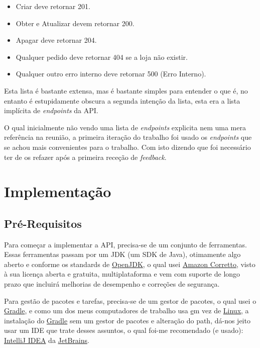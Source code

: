 \begin{itemize}
  \item Criar deve retornar 201.
  \item Obter e Atualizar devem retornar 200.
  \item Apagar deve retornar 204.
  \item Qualquer pedido deve retornar 404 se a loja não existir.
  \item Qualquer outro erro interno deve retornar 500 (Erro Interno).
\end{itemize}

Esta lista  é bastante extensa, mas é bastante simples para entender o que é, no entanto é estupidamente obscura a segunda intenção da lista, esta era a lista implícita de \textit{endpoints} da API\@.

O qual inicialmente não vendo uma lista de \textit{endpoints} explicita nem uma mera referência na reunião, a primeira iteração do trabalho foi usado os \textit{endpoints} que se achou mais convenientes para o trabalho. Com isto dizendo que foi necessário ter de os refazer após a primeira receção de \textit{feedback}.

\section{Implementação}

\subsection{Pré-Requisitos}

Para começar a implementar a API, precisa-se de um conjunto de ferramentas. Essas ferramentas passam por um JDK (um SDK de Java), otimamente algo aberto e conforme os standards de \href{https://openjdk.org/}{OpenJDK}, o qual usei \href{https://docs.aws.amazon.com/corretto/latest/corretto-17-ug/downloads-list.html}{Amazon Corretto}, visto à sua licença aberta e gratuita, multiplataforma e vem com suporte de longo prazo que incluirá melhorias de desempenho e correções de segurança.

Para gestão de pacotes e tarefas, precisa-se de um gestor de pacotes, o qual usei o \href{https://gradle.org/}{Gradle}, e como um dos meus computadores de trabalho usa \href{https://www.microsoft.com/pt-pt/software-download/windows10} em vez de \href{https://archlinux.org/download/}{Linux}, a instalação do \href{https://gradle.org/}{Gradle} sem um gestor de pacotes e alteração do path, dá-nos jeito usar um IDE que trate desses assuntos, o qual foi-me recomendado (e usado): \href{https://www.jetbrains.com/idea/}{IntelliJ IDEA} da \href{https://www.jetbrains.com/}{JetBrains}.

